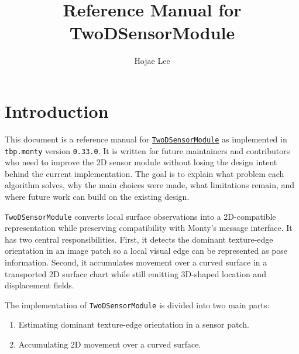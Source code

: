 \documentclass{article}
\title{Reference Manual for TwoDSensorModule}
\author{Hojae Lee}
\begin{document}
\maketitle
\tableofcontents

\section{Introduction}

This document is a reference manual for
\href{https://github.com/thousandbrainsproject/tbp.monty}{\texttt{TwoDSensorModule}}
as implemented in \texttt{tbp.monty} version \texttt{0.33.0}. It is written
for future maintainers and contributors who need to improve the 2D sensor
module without losing the design intent behind the current implementation. The
goal is to explain what problem each algorithm solves, why the main choices
were made, what limitations remain, and where future work can build on the
existing design.

\texttt{TwoDSensorModule} converts local surface observations into a
2D-compatible representation while preserving compatibility with Monty's
message interface. It has two central responsibilities. First, it detects the
dominant texture-edge orientation in an image patch so a local visual edge can
be represented as pose information. Second, it accumulates movement over a
curved surface in a transported 2D surface chart while still emitting
3D-shaped location and displacement fields.

The implementation of \texttt{TwoDSensorModule} is divided into two main
parts:

\begin{enumerate}
  \item Estimating dominant texture-edge orientation in a sensor patch.
  \item Accumulating 2D movement over a curved surface.
\end{enumerate}


\end{document}
